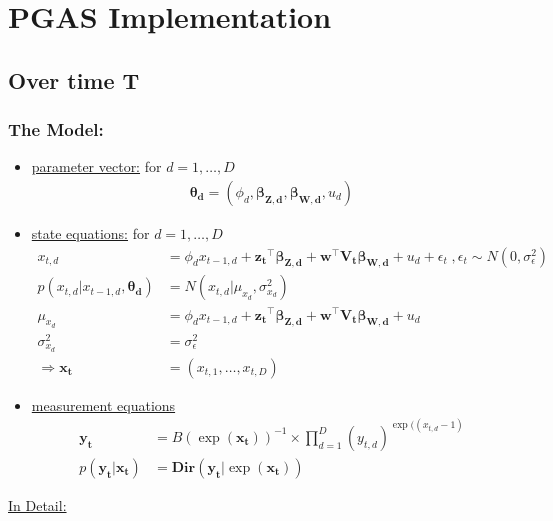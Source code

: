 \documentclass[a4paper,12pt]{scrartcl} %
\newcommand{\bs}{\boldsymbol}  %
\newcommand{\given}{\lvert}
\newcommand{\Dir}{\textbf{Dir}}
\newcommand{\prodd}{\prod_{d=1}^D}
\begin{document}
\section{PGAS Implementation}
\subsection{Over time T}
\subsubsection{The Model:}
\begin{itemize}
\item[] \underline{parameter vector:} for $d=1,\ldots,D$
\begin{align*}
\bs{\theta_d}=(\phi_d,\bs{\beta_{Z,d}},\bs{\beta_{W,d}},u_d)
\end{align*}
\item[] \underline{state equations:} for $d=1,\ldots,D$
\begin{align*}
%
%
%
x_{t,d}&= \phi_d x_{t-1,d} +  \bs{z_{t}}^{\top} \bs{\beta_{Z,d}} +\bs{w}^{\top}\bs{V_{t}}\bs{\beta_{W,d}} + u_d + \epsilon_t\;, \epsilon_t \sim N(0,\sigma_{\epsilon}^2)\\
p(x_{t,d}\given x_{t-1,d},\bs{\theta_d})&=N(x_{t,d}\given \mu_{x_{d}}, \sigma_{x_{d}}^2)\\
\mu_{x_{d}}&=\phi_d x_{t-1,d} +  \bs{z_{t}}^{\top} \bs{\beta_{Z,d}} +\bs{w}^{\top}\bs{V_{t}}\bs{\beta_{W,d}} + u_d\\ \sigma_{x_{d}}^2&=\sigma_{\epsilon}^2\\
\Rightarrow \bs{x_{t}}&=\left(x_{t,1},\ldots,x_{t,D}\right)
\end{align*}
\item[] \underline{measurement equations}
\begin{align*}
\bs{y_t}&= B\left(\exp(\bs{x_t})\right)^{-1}\times\prodd (y_{t,d})^{\exp((x_{t,d}-1)}\\
p(\bs{y_t}\given \bs{x_{t}}) &= \Dir\left(\bs{y_t}\given  \exp(\bs{x_t})\right)
\end{align*}
\end{itemize}
\clearpage
\underline{In Detail:}
\clearpage
\end{document}
